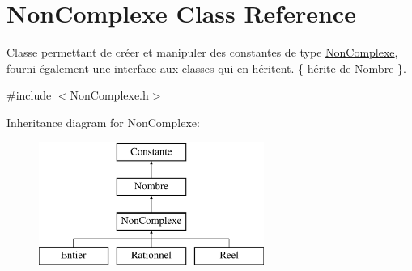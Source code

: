 \hypertarget{classNonComplexe}{\section{\-Non\-Complexe \-Class \-Reference}
\label{classNonComplexe}
}


\-Classe permettant de créer et manipuler des constantes de type \hyperlink{classNonComplexe}{\-Non\-Complexe}, fourni également une interface aux classes qui en héritent. \{ hérite de \hyperlink{classNombre}{\-Nombre} \}.  




{\ttfamily \#include $<$\-Non\-Complexe.\-h$>$}

\-Inheritance diagram for \-Non\-Complexe\-:\begin{figure}[H]
\begin{center}
\leavevmode
\includegraphics[height=4.000000cm]{classNonComplexe}
\end{center}
\end{figure}
